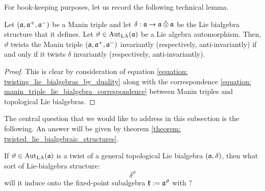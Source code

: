         For book-keeping purposes, let us record the following technical lemma.
        \begin{lemma} \label{lemma: twisted_manin_triples_and_twisted_topological_lie_bialgebras}
            Let $(\mathfrak{a}, \mathfrak{a}^+, \mathfrak{a}^-)$ be a Manin triple and let $\delta: \a \to \a \hattensor \a$ be the Lie bialgebra structure that it defines. Let $\vartheta \in \operatorname{Aut}_{\mathrm{LA}}(\mathfrak{a})$ be a Lie algebra automorphism. Then, $\vartheta$ twists the Manin triple $(\mathfrak{a}, \mathfrak{a}^+, \mathfrak{a}^-)$ invariantly (respectively, anti-invariantly) if and only if it twists $\delta$ invariantly (respectively, anti-invariantly).
        \end{lemma}
            \begin{proof}
                This is clear by consideration of equation \eqref{equation: twisting_lie_bialgebras_by_duality} along with the correspondence \eqref{equation: manin_triple_lie_bialgebra_correspondence} between Manin triples and topological Lie bialgebras.
            \end{proof}

        The central question that we would like to address in this subsection is the following. An answer will be given by theorem \ref{theorem: twisted_lie_bialgebraic_structures}.
        \begin{question} \label{question: twisted_topological_lie_bialgebras}
            If $\vartheta \in \operatorname{Aut}_{\mathrm{LA}}(\mathfrak{a})$ is a twist of a general topological Lie bialgebra $(\mathfrak{a}, \delta)$, then what sort of Lie-bialgebra structure:
                $$\delta^{\vartheta}$$
            will it induce onto the fixed-point subalgebra $\mathfrak{k} := \mathfrak{a}^{\vartheta}$ with ?
        \end{question}
        

